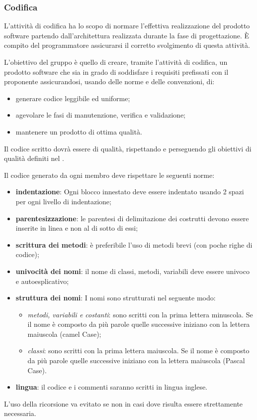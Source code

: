 \subsubsection{Codifica}
L'attività di codifica ha lo scopo di normare l'effettiva realizzazione del prodotto software partendo dall'architettura realizzata durante la fase di progettazione. È compito del programmatore assicurarsi il corretto svolgimento di questa attività.

L'obiettivo del gruppo \Omicron{} è quello di creare, tramite l'attività di codifica, un prodotto software che sia in grado di soddisfare i requisiti prefissati con il proponente assicurandosi, usando delle norme e delle convenzioni, di:
\begin{itemize}
\item generare codice leggibile ed uniforme;
\item agevolare le fasi di manutenzione, verifica e validazione;
\item mantenere un prodotto di ottima qualità. 
\end{itemize}

Il codice scritto dovrà essere di qualità, rispettando e perseguendo gli obiettivi di qualità definiti nel .

Il codice generato da ogni membro deve rispettare le seguenti norme:
\begin{itemize}
\item \textbf{indentazione}: Ogni blocco innestato deve essere indentato usando 2 spazi per ogni livello di indentazione;
\item \textbf{parentesizzazione}: le parentesi di delimitazione dei costrutti devono essere inserite in linea e non al di sotto di essi;
\item \textbf{scrittura dei metodi}: è preferibile l'uso di metodi brevi (con poche righe di codice);
\item \textbf{univocità dei nomi}: il nome di classi, metodi, variabili deve essere univoco e autoesplicativo;
\item \textbf{struttura dei nomi}: I nomi sono strutturati nel seguente modo:
\begin{itemize}
\item \textit{metodi, variabili e costanti}: sono scritti con la prima lettera minuscola. Se il nome è composto da più parole quelle successive iniziano con la lettera maiuscola (camel Case);
\item \textit{classi}: sono scritti con la prima lettera maiuscola. Se il nome è composto da più parole quelle successive iniziano con la lettera maiuscola (Pascal Case).
\end{itemize} 
\item \textbf{lingua}: il codice e i commenti saranno scritti in lingua inglese.
\end{itemize}

L'uso della ricorsione va evitato se non in casi dove risulta essere strettamente necessaria.
